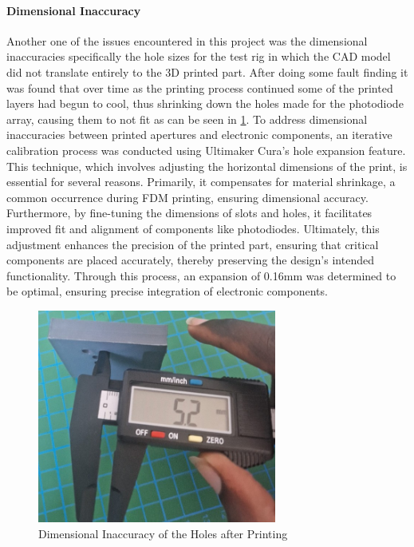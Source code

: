 \paragraph{Dimensional Inaccuracy}

Another one of the issues encountered in this project was the dimensional inaccuracies specifically the hole sizes for the test rig in which the CAD model did not translate entirely to the 3D printed part.  
After doing some fault finding it was found that over time as the printing process continued some of the printed layers had begun to cool, thus shrinking down the holes made for the photodiode array, causing them to not fit as can be seen in \ref{fig:DimInaccuracy}.  
To address dimensional inaccuracies between printed apertures and electronic components, an iterative calibration process was conducted using Ultimaker Cura's hole expansion feature. 
This technique, which involves adjusting the horizontal dimensions of the print, is essential for several reasons. 
Primarily, it compensates for material shrinkage, a common occurrence during FDM printing, ensuring dimensional accuracy. 
Furthermore, by fine-tuning the dimensions of slots and holes, it facilitates improved fit and alignment of components like photodiodes. 
Ultimately, this adjustment enhances the precision of the printed part, ensuring that critical components are placed accurately, thereby preserving the design's intended functionality. 
Through this process, an expansion of 0.16mm was determined to be optimal, ensuring precise integration of electronic components.

\begin{figure}[htbp]
    \centering
    \includegraphics[width=0.7\textwidth]{figures/CAD-3DPrint/WrongDimensions.jpg}
    \caption{Dimensional Inaccuracy of the Holes after Printing}
    \label{fig:DimInaccuracy}
    
   
    
\end{figure}
%
%

